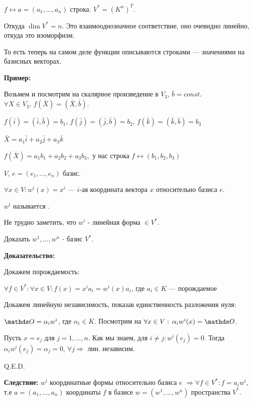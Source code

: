 $f \leftrightarrow a= (a_1,\ldots, a_n)$ строка. %
$V^* = (K^n)^T$. 

Откуда $\dim V^*  = n$. 
Это взаимооднозначное соответствие, оно очевидно линейно, откуда это изоморфизм.

То есть теперь на самом деле функции описываются строками --- значениями на базисных векторах.



\textbf{Пример:} 

 Возьмем и посмотрим на скалярное произведение в
$V_3, \, \bar{b}= const$. $\forall X \in V_3, \, f(\bar{X})=(\bar{X}, \bar{b})$.

$f(\bar{i})=(\bar{i}, \bar{b}) = b_1$, $f(\bar{j})=(\bar{j}, \bar{b}) = b_2$, $f(\bar{k})=(\bar{k}, \bar{b}) = b_3$

$\bar{X}=a_1\bar{i}+a_2\bar{j}+a_3\bar{k}$

$f(\bar{X})=a_1b_1+a_2b_2+a_3b_3, $ у нас строка $f \leftrightarrow (b_1,b_2,b_3)$

 $V$, $e = (e_1,\ldots, e_n)$ базис.

$\forall x \in V: w^i(x) = x^i$ --- $i$-ая координата вектора $x$ относительно базиса $e$.  

$w^i$ называется .

Не трудно заметить, что $w^i$ - линейная форма $\in V^{*}$.


Доказать $w^1,\ldots,w^n$ - базис $V^*$.

\textbf{Доказательство:}

Докажем порождаемость: 

$\forall f \in V^*: \forall x \in V: f(x) = x^i a_i = w^i(x)a_i$, где $a_i \in K$ --- порождаемое

Докажем линейную независимость, показав единственность разложения нуля:

$\zero = \alpha_i w^i $, где $\alpha_i \in K$. Посмотрим на $\forall x \in V: \, \alpha_iw^i(x)=\zero$.

Пусть $x = e_j$ для $j = 1,\ldots, n$. Как мы знаем, для $i\neq j: w^i(e_j) = 0$. Тогда $\alpha_iw^i(e_j)=\alpha_j =0$,
$\forall j \Rightarrow $ лин. независим.

\hfill Q.E.D.

\textbf{Следствие:} $w^i$ координатные формы относительно базиса $e$
$\Rightarrow \forall f \in V^*: f = a_iw^i$, т.е $a=(a_1,\ldots,a_n)$  координаты $f$ в базисе $w = (w^1,\ldots, w^n)$ пространства $V^*$.

